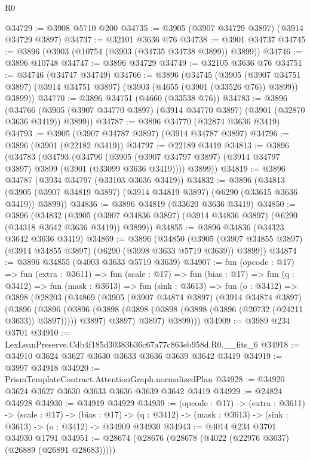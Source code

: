 \begin{lexlean}{R0}
\begin{coremodule}
@34729 := @3908 @5710 @200
@34735 := @3905 (@3907 @34729 @3897) (@3914 @34729 @3897)
@34737 := @32101 @3636 @76
@34738 := @3901 @34737
@34745 := @3896 (@3903 (@10754 (@3903 (@34735 @34738 @3899)) @3899))
@34746 := @3896 @10748
@34747 := @3896 @34729
@34749 := @32105 @3636 @76
@34751 := @34746 (@34747 @34749)
@34766 := @3896
    (@34745
      (@3905
        (@3907 @34751 @3897)
        (@3914 @34751 @3897)
        (@3903 (@4655 (@3901 (@33526 @76)) @3899))
        @3899))
@34770 := @3896 @34751 (@4660 (@33538 @76))
@34783 := @3896
    (@34766 (@3905 (@3907 @34770 @3897) (@3914 @34770 @3897) (@3901 (@32870 @3636 @3419)) @3899))
@34787 := @3896 @34770 (@32874 @3636 @3419)
@34793 := @3905 (@3907 @34787 @3897) (@3914 @34787 @3897)
@34796 := @3896 (@3901 (@22182 @3419))
@34797 := @22189 @3419
@34813 := @3896
    (@34783
      (@34793
        (@34796
          (@3905 (@3907 @34797 @3897) (@3914 @34797 @3897) @3899 (@3901 (@33099 @3636 @3419))))
        @3899))
@34819 := @3896 @34787 (@3934 @34797 (@33103 @3636 @3419))
@34832 := @3896
    (@34813 (@3905 (@3907 @34819 @3897) (@3914 @34819 @3897) (@6290 (@33615 @3636 @3419)) @3899))
@34836 := @3896 @34819 (@33620 @3636 @3419)
@34850 := @3896
    (@34832
      (@3905 (@3907 @34836 @3897) (@3914 @34836 @3897) (@6290 (@34318 @3642 @3636 @3419)) @3899))
@34855 := @3896 @34836 (@34323 @3642 @3636 @3419)
@34869 := @3896
    (@34850
      (@3905 (@3907 @34855 @3897) (@3914 @34855 @3897) (@6290 (@3998 @3633 @5719 @3639)) @3899))
@34874 := @3896 @34855 (@4003 @3633 @5719 @3639)
@34907 := fun (opcode : @17) =>
  fun (extra : @3611) =>
  fun (scale : @17) =>
  fun (bias : @17) =>
  fun (q : @3412) =>
  fun (mask : @3613) =>
  fun (sink : @3613) =>
  fun (o : @3412) =>
  @3898
    (@28203
      (@34869
        (@3905
          (@3907 @34874 @3897)
          (@3914 @34874 @3897)
          (@3896
            (@3896
              (@3896 (@3898 (@3898 (@3898 (@3898 (@3896 (@20732 (@24211 @3633)) @3897))))) @3897)
              @3897)
            @3897)
          @3899)))
@34909 := @3989 @234 @3701
@34910 := LexLeanPreserve.Cdb4f185d30383b36c67a77c863eb958d.R0.__fits_6
@34918 := @34910 @3624 @3627 @3630 @3633 @3636 @3639 @3642 @3419
@34919 := @3997 @34918
@34920 := PrismTemplateContract.AttentionGraph.normalizedPlan
@34928 := @34920 @3624 @3627 @3630 @3633 @3636 @3639 @3642 @3419
@34929 := @24824 @34928
@34930 := @34919 @34929
@34939 := (opcode : @17) ->
  (extra : @3611) ->
  (scale : @17) ->
  (bias : @17) -> (q : @3412) -> (mask : @3613) -> (sink : @3613) -> (o : @3412) -> @34909 @34930
@34943 := @4014 @234 @3701 @34930 @1791
@34951 := @28674 (@28676 (@28678 (@4022 (@22976 @3637) (@26889 (@26891 @28683)))))

\end{coremodule}
\end{lexlean}
